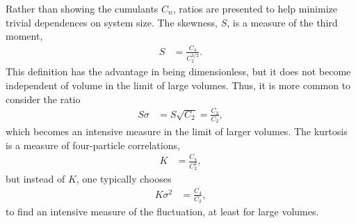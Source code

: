 \documentclass[aps,prc,nofootinbib,showpacs,superscriptaddress,groupedaddress]{revtex4-1}
\begin{document}
Rather than showing the cumulants $C_n$, ratios are presented to help minimize trivial dependences on system size. The skewness, $S$, is a measure of the third moment,
\begin{eqnarray}
S&=\frac{C_4}{C_2^{3/2}}.
\end{eqnarray}
This definition has the advantage in being dimensionless, but it does not become independent of volume in the limit of large volumes. Thus, it is more common to consider the ratio
\begin{eqnarray}
S\sigma&=S\sqrt{C_2}=\frac{C_3}{C_2},
\end{eqnarray}
which becomes an intensive measure in the limit of larger volumes. The kurtosis is a measure of four-particle correlations,
\begin{eqnarray}
K&=\frac{C_4}{C_2^2},
\end{eqnarray}
but instead of $K$, one typically chooses
\begin{eqnarray}
K\sigma^2&=\frac{C_4}{C_2},
\end{eqnarray}
to find an intensive measure of the fluctuation, at least for large volumes. 
\end{document}
